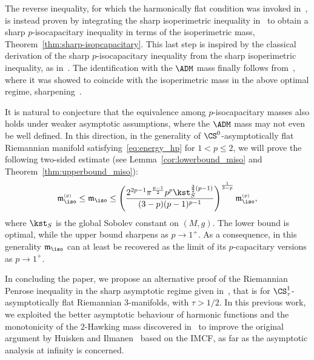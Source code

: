\documentclass[10pt,a4paper]{amsart}
\numberwithin{equation}{section}
\newcommand{\ma}{\mathfrak{m}}
\newcommand{\tp}[1][p]{{\text{\tiny$(#1)$}}}
\begin{document}
The reverse inequality, for which the harmonically flat condition was invoked in~\cite{jauregui_admmasscapacityvolumedeficit_2020}, is instead proven by integrating the sharp isoperimetric inequality in~\cite[Corollary~C.3]{chodosh_isoperimetryscalarcurvaturemass_2021} to obtain a sharp $p$-isocapacitary inequality in terms of the isoperimetric mass, Theorem~\ref{thm:sharp-isopcapacitary}. This last step is inspired by the classical derivation of the sharp $p$-isocapacitary inequality from the sharp isoperimetric inequality, as in~\cite[Theorem 4.1]{benatti_minkowskiinequalitycompleteriemannian_2022}.
The identification with the $\ADM$ mass finally follows from~\cite[Theorem 4.13]{benatti_isoperimetricriemannianpenroseinequality_2022}, where it was showed to coincide with the isoperimetric mass in the above optimal regime, sharpening~\cite[Theorem 3]{jauregui_lowersemicontinuitymass0_2019}.

It is natural to conjecture that the equivalence among $p$-isocapacitary masses also holds under weaker asymptotic assumptions, where the $\ADM$ mass may not even be well defined.
In this direction, in the generality of $\CS^0$-asymptotically flat Riemannian manifold satisfying~\eqref{eq:energy_hp} for $1<p\leq 2$, we will prove the following two-sided estimate (see Lemma~\ref{cor:lowerbound_miso} and Theorem~\ref{thm:upperbound_miso}):
\[
\ma^{\tp}_{\iso} \leq \ma_{\iso} \leq \left( \frac{2^{2p-1}\pi^{\frac{p-1}{2}} p^{p}\kst_{S}^{\frac{3}{2}(p-1)}}{(3-p) (p-1)^{p-1}} \right)^{\frac{1}{3-p}} \ma^{\tp}_{\iso},
\]
where $\kst_{S}$ is the global Sobolev constant on $(M,g)$. The lower bound is optimal, while the upper bound sharpens as $p\to 1^+$. As a consequence, in this generality $\ma_{\iso}$ can at least be recovered as the limit of its $p$-capacitary versions as $p \to 1^+$.


In concluding the paper, we propose an alternative proof of the Riemannian Penrose inequality in the sharp asymptotic regime given in~\cite{benatti_isoperimetricriemannianpenroseinequality_2022}, that is for $\CS^1_\tau$-asymptotically flat Riemannian $3$-manifolds, with $\tau > 1/2$. In this previous work, we exploited the better asymptotic behaviour of harmonic functions and the monotonicity of the $2$-Hawking mass discovered in~\cite{agostiniani_greenfunctionproofpositive_2021} to improve the original argument by Huisken and Ilmanen~\cite{huisken_inversemeancurvatureflow_2001} based on the IMCF, as far as the asymptotic analysis at infinity is concerned.
\end{document}
